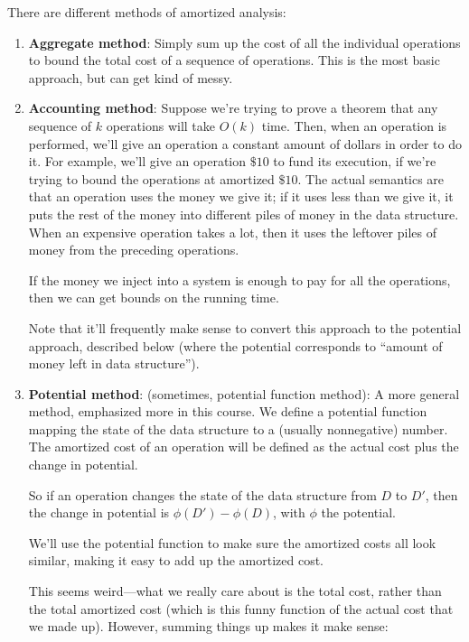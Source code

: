 \documentclass{article}
\begin{document}
There are different methods of amortized analysis:
\begin{enumerate}

	\item 
	\textbf{Aggregate method}:
	Simply sum up the cost of all the individual operations to bound the total
	cost of a sequence of operations.
	This is the most basic approach, but can get kind of messy.
	
	\item
	\textbf{Accounting method}: 
	Suppose we're trying to prove a theorem that any sequence of $k$ 
	operations
	will take $O(k)$ time.
	Then, when an operation is performed, we'll 
	give an operation a constant amount of dollars in order to do it. 
	For example, we'll
	give an operation $\$10$ to fund its execution, if we're trying to bound
	the operations at amortized $\$10$.
	The actual semantics are that an operation uses the money we give it; if
	it uses less than we give it, it puts the rest of the money into different
	piles of money in the data structure.
	When an expensive operation takes a lot, then it uses the leftover piles
	of money from the preceding operations.
	
	If the money we inject into a system is enough to pay for all the 
	operations,
	then we can get bounds on the running time.
	
	Note that it'll frequently make sense to convert this approach
	to the potential approach, described below (where the potential
	corresponds to ``amount of money left in data structure'').
	
	\item
	\textbf{Potential method}: (sometimes, potential function method):
	A more general method, emphasized more in this course.
	We define a potential function mapping the state of the 
	data structure to a (usually nonnegative) number.
	The amortized cost of an operation will be defined as the actual cost plus
	the change in potential.
	
	So if an operation changes the state of the data structure from
	$D$ to $D'$, then the change in potential is $\phi(D') - \phi(D)$, with
	$\phi$ the potential.
	
	We'll use the potential function to make sure the amortized costs all
	look similar, making it easy to add up the amortized cost.
	
	This seems weird---what we really care about is the total cost, rather
	than the total amortized cost (which is this funny function of the
	actual cost that we made up).
	However, summing things up makes it make sense:
	

\end{enumerate}
\end{document}
